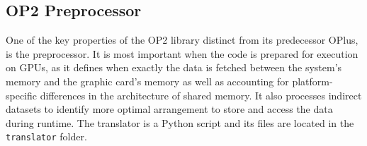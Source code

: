 \subsection{OP2 Preprocessor}\label{op2_implementation_notes}


One of the key properties of the OP2 library distinct from its predecessor OPlus, is the preprocessor. It is most important when the code is prepared for execution on GPUs, as it defines when exactly the data is fetched between the system's memory and the graphic card's memory as well as accounting for platform-specific differences in the architecture of shared memory. It also processes indirect datasets to identify more optimal arrangement to store and access the data during runtime. The translator is a Python script and its files are located in the \texttt{translator} folder. 


